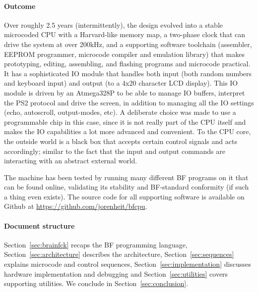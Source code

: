 \paragraph{Outcome}
Over roughly 2.5 years (intermittently), the design evolved into a stable microcoded CPU with a Harvard-like memory map, a two-phase clock that can drive the system at over 200kHz, and a supporting software toolchain (assembler, EEPROM programmer, microcode compiler and emulation library) that makes prototyping, editing, assembling, and flashing programs and microcode practical. It has a sophisticated IO module that handles both input (both random numbers and keyboard input) and output (to a 4x20 character LCD display). This IO module is driven by an Atmega328P to be able to manage IO buffers, interpret the PS2 protocol and drive the screen, in addition to managing all the IO settings (echo, autoscroll, output-modes, etc). A deliberate choice was made to use a programmable chip in this case, since it is not really part of the CPU itself and makes the IO capabilities a lot more advanced and convenient. To the CPU core, the outside world is a black box that accepts certain control signals and acts accordingly; similar to the fact that the input and output commands are interacting with an abstract external world.

The machine has been tested by running many different BF programs on it that can be found online, validating its stability and BF-standard conformity (if such a thing even exists). The source code for all supporting software is available on Github at \url{https://github.com/jorenheit/bfcpu}.

\paragraph{Document structure}
  Section~\ref{sec:brainfck} recaps the BF programming language, Section~\ref{sec:architecture} describes the architecture, Section~\ref{sec:sequences} explains microcode and control sequences, Section~\ref{sec:implementation} discusses hardware implementation and debugging and Section~\ref{sec:utilities} covers supporting utilities. We conclude in Section~\ref{sec:conclusion}. 
